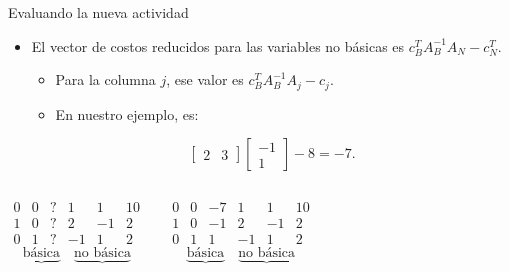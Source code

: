 \documentclass{beamer}
\begin{document}
\begin{frame}{Evaluando la nueva actividad}
\begin{itemize}
        \begin{itemize}
            \item Para la columna \( j \), esa columna es \( A_B^{-1} A_j \).
            \item En nuestro ejemplo, es:
        \end{itemize}
        \[
        \begin{bmatrix}
            2 & -1 \\
            -1 & 1
        \end{bmatrix}
        \begin{bmatrix}
            0 \\
            1
        \end{bmatrix}
        =
        \begin{bmatrix}
            -1 \\
            1
        \end{bmatrix}.
        \]
        
        \item El vector de costos reducidos para las variables no básicas es \( c_B^T A_B^{-1} A_N - c_N^T \).
        \begin{itemize}
            \item Para la columna \( j \), ese valor es \( c_B^T A_B^{-1} A_j - c_j \).
            \item En nuestro ejemplo, es:
        \end{itemize}
        \[
        \begin{bmatrix}
            2 & 3
        \end{bmatrix}
        \begin{bmatrix}
            -1 \\
            1
        \end{bmatrix}
        - 8 = -7.
        \]
    \end{itemize}
    
    \begin{columns}
        \[
        \begin{array}{ccccc|c}
            0 & 0 & ? & 1 & 1 & 10 \\
            \hline
            1 & 0 & ? & 2 & -1 & 2 \\
            0 & 1 & ? & -1 & 1 & 2
        \end{array}
        \]
        \[
        \underbrace{\text{básica}}_{\phantom{a}} \quad
        \underbrace{\text{no básica}}
        \]

        \[
        \begin{array}{ccccc|c}
            0 & 0 & -7 & 1 & 1 & 10 \\
            \hline
            1 & 0 & -1 & 2 & -1 & 2 \\
            0 & 1 & 1 & -1 & 1 & 2
        \end{array}
        \]
        \[
        \underbrace{\text{básica}}_{\phantom{a}} \quad
        \underbrace{\text{no básica}}
        \]
    \end{columns}
\end{frame}
\end{document}
